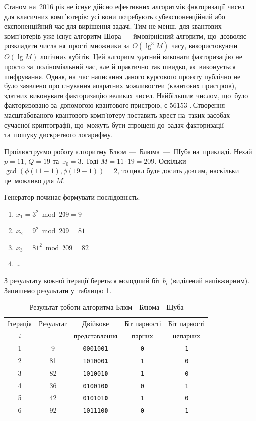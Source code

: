 \documentclass[a4paper,oneside,titlepage,14pt]{extarticle}
\begin{document}
				Станом на~2016 рік не існує дійсно ефективних алгоритмів факторизації чисел для класичних комп'ютерів: усі вони потребують субекспоненційний або експоненційний час для вирішення задачі. Тим не менш, для квантових комп'ютерів уже існує алгоритм Шора~--- ймовірнісний алгоритм, що~дозволяє розкладати числа на~прості множники за~$O(\lg^3M)$ часу, використовуючи $O(\lg M)$ логічних кубітів. Цей алгоритм здатний виконати факторизацію не просто за~поліноміальний час, але й практично так швидко, як~виконується шифрування. Однак, на~час написання даного курсового проекту публічно не було заявлено про існування апаратних можливостей (квантових пристроїв), здатних виконувати факторизацію великих чисел. Найбільшим числом, що~було факторизовано за~допомогою квантового пристрою, є 56153 \cite{quantumfactorization}. Створення масштабованого квантового комп'ютеру поставить хрест на~таких засобах сучасної криптографії, що~можуть бути спрощені до~задач факторизації та~пошуку дискретного логарифму.\par
				Проілюструємо роботу алгоритму Блюм~---~Блюма~---~Шуба на~прикладі. Нехай $p = 11$, $Q = 19$ та~$x_0 = 3$. Тоді $M = 11 \cdot 19 = 209$. Оскільки $\gcd{ \left(\phi(11-1), \phi(19-1)\right) = 2}$, то цикл буде досить довгим, наскільки це~можливо для $M$.\par
				Генератор починає формувати послідовність:
				\begin{enumerate}
					\item $x_1 = 3^2 \bmod{209} = 9$
					\item $x_2 = 9^2 \bmod{209} = 81$
					\item $x_3 = 81^2 \bmod{209} = 82$
					\item[] \dots
				\end{enumerate}
				\par
				З результату кожної ітерації береться молодший біт $b_i$ (виділений напівжирним). Запишемо результати у~таблицю \ref{BBSExample}.\par
				\begin{table}[H]
					\centering
					\begin{tabular}{ccccc}
						\toprule
							Ітерація & Результат & Двійкове & Біт парності & Біт парності \\
							 $i$ & & представлення & парних & непарних \\
						\midrule
							1 & 9 & \texttt{000100\textbf{1}} & \texttt{0} & \texttt{1} \\
							2 & 81 & \texttt{101000\textbf{1}} & \texttt{1} & \texttt{0} \\
							3 & 82 & \texttt{101001\textbf{0}} & \texttt{1} & \texttt{0}\\
							4 & 36 & \texttt{010010\textbf{0}} & \texttt{0} & \texttt{1}\\
							5 & 42 & \texttt{010101\textbf{0}} & \texttt{1} & \texttt{0}\\
							6 & 92 & \texttt{101110\textbf{0}} & \texttt{0} & \texttt{1}\\
						\bottomrule
					\end{tabular}
					\caption{Результат роботи алгоритма Блюм—Блюма—Шуба}
					\label{BBSExample}
				\end{table}
\end{document}
